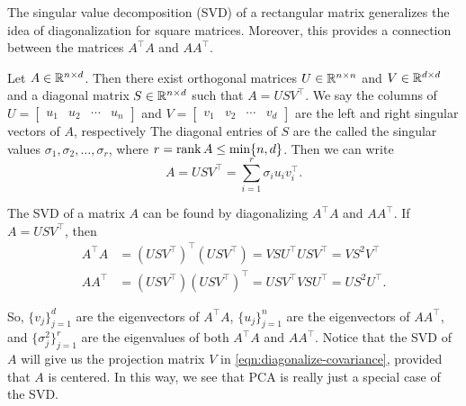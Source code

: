 The singular value decomposition (SVD) of a rectangular matrix generalizes the idea of diagonalization for square matrices.
Moreover, this provides a connection between the matrices \(A^\top A\) and \(AA^\top\).

\begin{theorem}
    \label{thm:svd}
    \cite{horn2013matrix}
    Let \(A \in \mathbb{R}^{n \times d}\).
    Then there exist orthogonal matrices \(U \in \mathbb{R}^{n \times n}\) and \(V \in \mathbb{R}^{d \times d}\) and a diagonal matrix \(S \in \mathbb{R}^{n \times d}\) such that \(A = USV^\top\).
    We say the columns of \(U = \begin{bmatrix}
        u_1 & u_2 & \cdots & u_n
    \end{bmatrix}\) and \(V = \begin{bmatrix}
        v_1 & v_2 & \cdots & v_d
    \end{bmatrix}\) are the left and right singular vectors of \(A\), respectively
    The diagonal entries of \(S\) are the called the singular values \(\sigma_1, \sigma_2, \dots, \sigma_r\), where \(r = \operatorname{rank} A \leq \min\{n,d\}\).
    Then we can write
    \begin{equation}
        \label{eqn:svd}
        A = USV^\top = \sum_{i=1}^{r} \sigma_i u_i v_i^\top.
    \end{equation}
\end{theorem}

The SVD of a matrix \(A\) can be found by diagonalizing \(A^\top A\) and \(AA^\top\).
If \(A = USV^\top\), then
\begin{align*}
    A^\top A &= (USV^\top)^\top (USV^\top) = V S U^\top U S V^\top = V S^2 V^\top\\
    AA^\top  &= (USV^\top) (USV^\top)^\top = U S V^\top V S U^\top = U S^2 U^\top.
\end{align*}

So, \(\{v_j\}_{j=1}^d\) are the eigenvectors of \(A^\top A\), \(\{u_j\}_{j=1}^n\) are the eigenvectors of \(AA^\top\), and \(\{\sigma_j^2\}_{j=1}^r\) are the eigenvalues of both \(A^\top A\) and \(AA^\top\).
Notice that the SVD of \(A\) will give us the projection matrix \(V\) in \cref{eqn:diagonalize-covariance}, provided that \(A\) is centered.
In this way, we see that PCA is really just a special case of the SVD.

